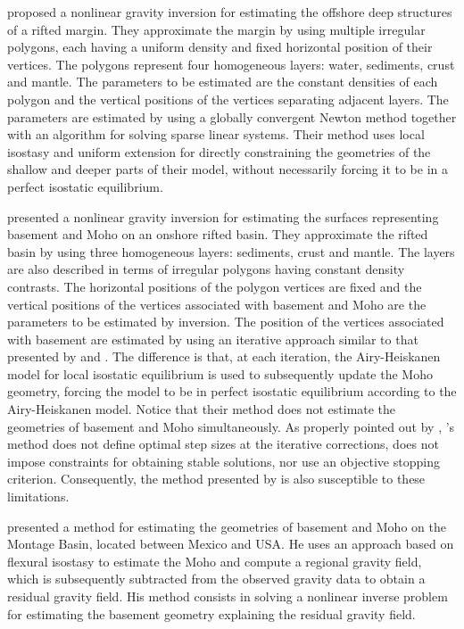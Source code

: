 \documentclass[manuscript]{geophysics}
\begin{document}
\citet{condi-etal1999} proposed a nonlinear gravity inversion for estimating the
offshore deep structures of a rifted margin.
They approximate the margin by using multiple irregular polygons, each having a 
uniform density and fixed horizontal position of their vertices.
The polygons represent four homogeneous layers: water, sediments, crust and mantle.
The parameters to be estimated are the constant densities of each polygon and 
the vertical positions of the vertices separating adjacent layers.
The parameters are estimated by using a globally convergent Newton method
together with an algorithm for solving sparse linear systems.
Their method uses local isostasy and uniform extension for directly constraining the 
geometries of the shallow and deeper parts of their model, without necessarily
forcing it to be in a perfect isostatic equilibrium.

\citet{salem-etal2014} presented a nonlinear gravity inversion for estimating the 
surfaces representing basement and Moho on an onshore rifted basin. 
They approximate the rifted basin by using three homogeneous layers: sediments, crust and mantle.
The layers are also described in terms of irregular polygons having constant density
contrasts.
The horizontal positions of the polygon vertices are fixed and the vertical positions
of the vertices associated with basement and Moho are the parameters to be estimated by 
inversion.
The position of the vertices associated with basement are estimated 
by using an iterative approach similar to that
presented by \citet{bott1960} and \citet{cordell-henderson1968}. 
The difference is that, at each iteration, the Airy-Heiskanen model
\citep[][$\,$ p. 135]{heiskanen-moritz1967} for local isostatic equilibrium is used 
to subsequently update the Moho geometry, forcing the model to be in
perfect isostatic equilibrium according to the Airy-Heiskanen model.
Notice that their method does not estimate the geometries of basement and Moho 
simultaneously.
As properly pointed out by \citet{silva-etal2014}, \citeauthor{bott1960}'s
method does not define optimal step sizes at the iterative corrections,
does not impose constraints for obtaining stable solutions, nor use
an objective stopping criterion. 
Consequently, the method presented by \citet{salem-etal2014} is also susceptible 
to these limitations.

\citet{garcia-abdeslem2017} presented a method for estimating the 
geometries of basement and Moho on the Montage Basin, located between Mexico and USA.
He uses an approach based on flexural isostasy to estimate the Moho and compute 
a regional gravity field, which is subsequently subtracted from the observed gravity 
data to obtain a residual gravity field. 
His method consists in solving a nonlinear inverse problem for estimating the
basement geometry explaining the residual gravity field.
\end{document}

